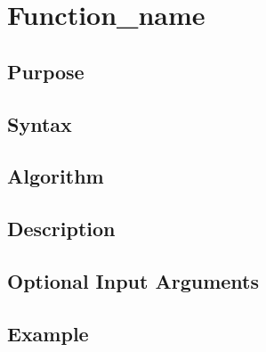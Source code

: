 
\chapter{Function_name} %
\label{cha:function_name} %

\section{Purpose} %
\label{sec:purpose}



\section{Syntax} %
\label{sec:syntax}




\section{Algorithm} %
\label{sec:algorithm}



\section{Description} %
\label{sec:description}



\section{Optional Input Arguments} %
\label{sec:optional_input_arguments}



\section{Example} %
\label{sec:example}

